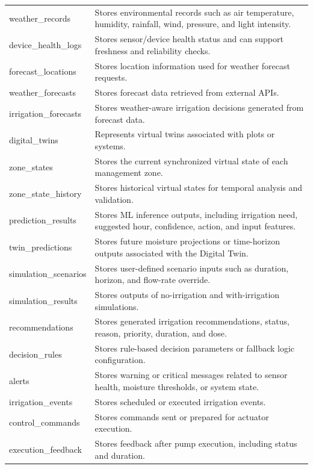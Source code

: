 \begin{footnotesize}
\begin{longtable}{@{}>{\raggedright\arraybackslash}p{}>{\raggedright\arraybackslash}p{}@{}}
weather\_records & Stores environmental records such as air temperature, humidity, rainfall, wind, pressure, and light intensity. \\
device\_health\_logs & Stores sensor/device health status and can support freshness and reliability checks. \\
forecast\_locations & Stores location information used for weather forecast requests. \\
weather\_forecasts & Stores forecast data retrieved from external APIs. \\
irrigation\_forecasts & Stores weather-aware irrigation decisions generated from forecast data. \\
digital\_twins & Represents virtual twins associated with plots or systems. \\
zone\_states & Stores the current synchronized virtual state of each management zone. \\
zone\_state\_history & Stores historical virtual states for temporal analysis and validation. \\
prediction\_results & Stores ML inference outputs, including irrigation need, suggested hour, confidence, action, and input features. \\
twin\_predictions & Stores future moisture projections or time-horizon outputs associated with the Digital Twin. \\
simulation\_scenarios & Stores user-defined scenario inputs such as duration, horizon, and flow-rate override. \\
simulation\_results & Stores outputs of no-irrigation and with-irrigation simulations. \\
recommendations & Stores generated irrigation recommendations, status, reason, priority, duration, and dose. \\
decision\_rules & Stores rule-based decision parameters or fallback logic configuration. \\
alerts & Stores warning or critical messages related to sensor health, moisture thresholds, or system state. \\
irrigation\_events & Stores scheduled or executed irrigation events. \\
control\_commands & Stores commands sent or prepared for actuator execution. \\
execution\_feedback & Stores feedback after pump execution, including status and duration. \\
\bottomrule
\end{longtable}
\end{footnotesize}

